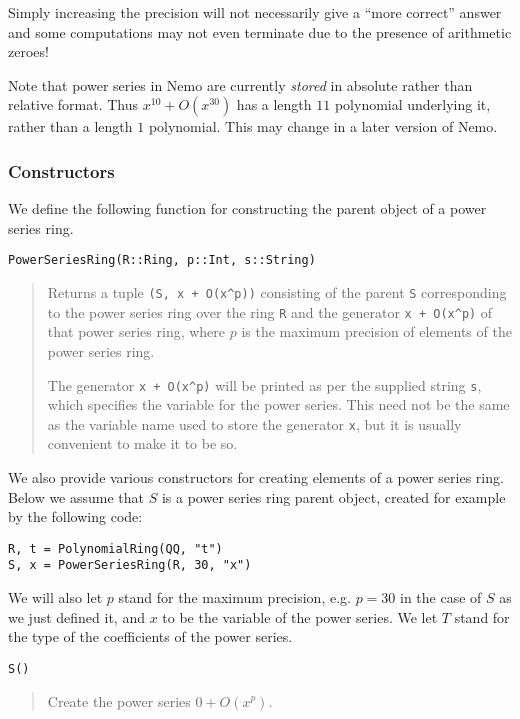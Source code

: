 \documentclass[a4paper,10pt]{article}
\newcommand{\code}{\lstinline}
\newcommand{\desc}[1]{\vspace{-3mm}\begin{quote}#1\end{quote}}
\begin{document}
Simply increasing the precision will not necessarily give a ``more correct''
answer and some computations may not even terminate due to the presence of
arithmetic zeroes!

Note that power series in Nemo are currently \emph{stored} in absolute 
rather than relative format. Thus $x^10 + O(x^30)$ has a length $11$
polynomial underlying it, rather than a length $1$ polynomial. This may
change in a later version of Nemo.

\subsubsection{Constructors}

We define the following function for constructing the parent object of a
power series ring.

\begin{lstlisting}
PowerSeriesRing(R::Ring, p::Int, s::String)
\end{lstlisting}

\desc{Returns a tuple \code{(S, x + O(x^p))} consisting of the parent \code{S} 
corresponding to the power series ring over the ring \code{R} and the generator
\code{x + O(x^p)} of that power series ring, where $p$ is the maximum precision
of elements of the power series ring.

The generator \code{x + O(x^p)} will be printed as per the supplied string
\code{s}, which specifies the variable for the power series. This need not be the
same as the variable name used to store the generator \code{x}, but it is usually
convenient to make it to be so.}

We also provide various constructors for creating elements of a power series
ring. Below we assume that $S$ is a power series ring parent object, created
for example by the following code:

\begin{lstlisting}
R, t = PolynomialRing(QQ, "t")
S, x = PowerSeriesRing(R, 30, "x")
\end{lstlisting}

We will also let $p$ stand for the maximum precision, e.g. $p = 30$ in the case of
$S$ as we just defined it, and $x$ to be the variable of the power series. We let
$T$ stand for the type of the coefficients of the power series.

\begin{lstlisting}
S()
\end{lstlisting}

\desc{Create the power series $0 + O(x^p)$.}
\end{document}
